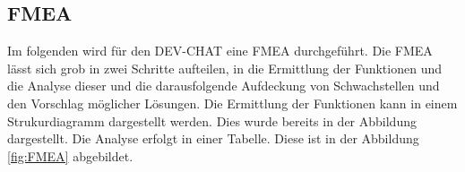 \subsection{\acl{FMEA}}
Im folgenden wird für den DEV-CHAT eine \ac{FMEA} durchgeführt.
 \autocite[][]{noauthor_fmea_nodate}
\newparagraph
Die \ac{FMEA} lässt sich grob in zwei Schritte aufteilen, in die Ermittlung der Funktionen und die Analyse dieser und die darausfolgende Aufdeckung von Schwachstellen und den Vorschlag möglicher Lösungen.
Die Ermittlung der Funktionen kann in einem Strukurdiagramm dargestellt werden.
Dies wurde bereits in der Abbildung dargestellt.
Die Analyse erfolgt in einer Tabelle. Diese ist in der Abbildung \ref{fig:FMEA} abgebildet.





